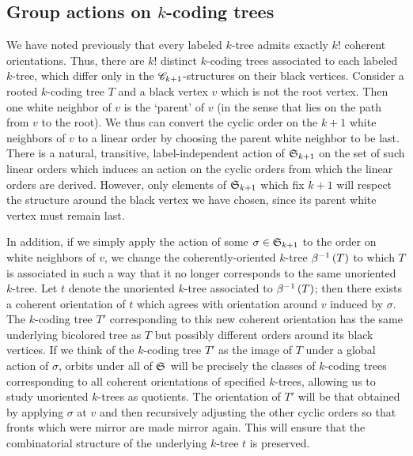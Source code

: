 \documentclass[sectionflow,singlespace,twoside,boldmathhdr,draft]{brandiss} %
\numberwithin{section}{chapter}
\numberwithin{figure}{chapter}
\begin{document}
\subsection{Group actions on $k$-coding trees}\label{ss:actct}

We have noted previously that every labeled $k$-tree admits exactly $k!$ coherent orientations.
Thus, there are $k!$ distinct $k$-coding trees associated to each labeled $k$-tree, which differ only in the $\mathscr{C}_{k+1}$-structures on their black vertices.
Consider a rooted $k$-coding tree $T$ and a black vertex $v$ which is not the root vertex.
Then one white neighbor of $v$ is the `parent' of $v$ (in the sense that lies on the path from $v$ to the root).
We thus can convert the cyclic order on the $k+1$ white neighbors of $v$ to a linear order by choosing the parent white neighbor to be last.
There is a natural, transitive, label-independent action of $ \mathfrak{S}_{k+1} $ on the set of such linear orders which induces an action on the cyclic orders from which the linear orders are derived.
However, only elements of $ \mathfrak{S}_{k+1} $ which fix $k+1$ will respect the structure around the black vertex we have chosen, since its parent white vertex must remain last.

In addition, if we simply apply the action of some $\sigma \in  \mathfrak{S}_{k+1} $ to the order on white neighbors of $v$, we change the coherently-oriented $k$-tree $\beta^{-1} \left( {T} \right)$ to which $T$ is associated in such a way that it no longer corresponds to the same unoriented $k$-tree.
Let $t$ denote the unoriented $k$-tree associated to $\beta^{-1} \left( {T} \right)$; then there exists a coherent orientation of $t$ which agrees with orientation around $v$ induced by $\sigma$.
The $k$-coding tree $T'$ corresponding to this new coherent orientation has the same underlying bicolored tree as $T$ but possibly different orders around its black vertices.
If we think of the $k$-coding tree $T'$ as the image of $T$ under a global action of $\sigma$, orbits under all of $ \mathfrak{S}_{} $ will be precisely the classes of $k$-coding trees corresponding to all coherent orientations of specified $k$-trees, allowing us to study unoriented $k$-trees as quotients.
The orientation of $T'$ will be that obtained by applying $\sigma$ at $v$ and then recursively adjusting the other cyclic orders so that fronts which were mirror are made mirror again.
This will ensure that the combinatorial structure of the underlying $k$-tree $t$ is preserved.
\end{document}

